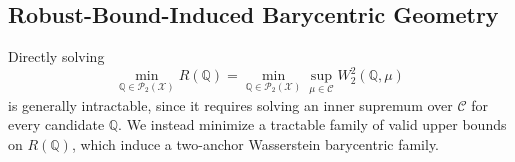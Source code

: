 

\subsection{Robust-Bound-Induced Barycentric Geometry}\label{sec:barycentric}

Directly solving
\begin{equation}
   \label{eq:intractable_objective}
\min_{\mathbb{Q}\in  \mathcal{P}_2(\mathcal X)}
R(\mathbb{Q})
=
\min_{\mathbb{Q}\in  \mathcal{P}_2(\mathcal X)}
\sup_{\mu\in\mathcal C}W_2^2(\mathbb{Q},\mu)
\end{equation} 
is generally intractable, since it requires solving an inner supremum over $\mathcal C$ for every candidate $\mathbb{Q}$. 
We instead minimize a tractable family of valid upper bounds on $R(\mathbb{Q})$, which induce a two-anchor Wasserstein barycentric family. %

